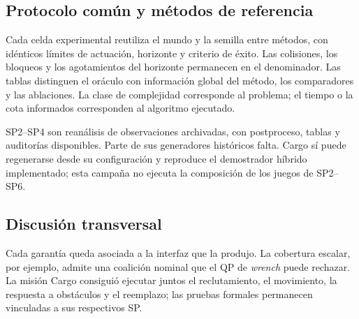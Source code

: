 \subsection{Protocolo común y métodos de referencia}
\label{subsec:common-protocol}

Cada celda experimental reutiliza el mundo y la semilla entre métodos, con idénticos límites de actuación, horizonte y criterio de éxito. Las colisiones, los bloqueos y los agotamientos del horizonte permanecen en el denominador. Las tablas distinguen el oráculo con información global del método, los comparadores y las ablaciones. La clase de complejidad corresponde al problema; el tiempo o la cota informados corresponden al algoritmo ejecutado.

SP2--SP4 son reanálisis de observaciones archivadas, con postproceso, tablas y auditorías disponibles. Parte de sus generadores históricos falta. Cargo sí puede regenerarse desde su configuración y reproduce el demostrador híbrido implementado; esta campaña no ejecuta la composición de los juegos de SP2--SP6.

\clearpage

\clearpage

\clearpage

\clearpage

\clearpage

\clearpage

\clearpage

\clearpage

\clearpage

\clearpage

\clearpage


\clearpage

\subsection{Discusión transversal}
\label{subsec:cross-discussion}

Cada garantía queda asociada a la interfaz que la produjo. La cobertura escalar, por ejemplo, admite una coalición nominal que el QP de \emph{wrench} puede rechazar. La misión Cargo consiguió ejecutar juntos el reclutamiento, el movimiento, la respuesta a obstáculos y el reemplazo; las pruebas formales permanecen vinculadas a sus respectivos SP.

